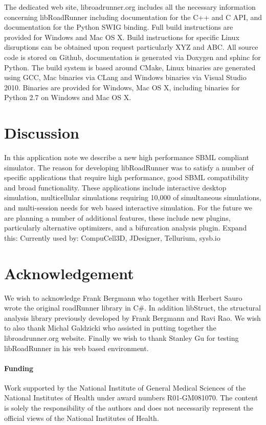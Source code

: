 \documentclass{bioinfo}
\begin{document}
\begin{methods}
The dedicated web site, libroadrunner.org includes all the necessary information concerning libRoadRunner including documentation for the C++ and C API, and documentation for the Python SWIG binding. Full build instructions are provided for Windows and Mac OS X. Build instructions for specific Linux disruptions can be obtained upon request particularly XYZ and ABC. All source code is stored on Github, documentation is generated via Doxygen and sphinc for Python. The build system is based around CMake, Linux binaries are generated using GCC, Mac binaries via CLang \citealp{Boffelli03} and Windows binaries via Visual Studio 2010. Binaries are provided for Windows, Mac OS X, including binaries for Python 2.7 on Windows and Mac OS X.

\end{methods}

\section{Discussion}

In this application note we describe a new high performance SBML compliant simulator. The reason for developing libRoadRunner was to satisfy a number of specific applications that require high performance, good SBML compatibility and broad functionality. These applications include interactive desktop simulation, multicellular simulations requiring 10,000 of simultaneous simulations, and multi-session needs for web based interactive simulation.  For the future we are planning a number of additional features, these include new plugins, particularly alternative optimizers, and a bifurcation analysis plugin. Expand this: Currently used by: CompuCell3D, JDesigner, Tellurium, sysb.io

\section*{Acknowledgement}
We wish to acknowledge Frank Bergmann who together with Herbert Sauro wrote the original roadRunner library in C\#. In addition libStruct, the structural analysis library previously developed by Frank Bergmann and Ravi Rao. We wish to also thank Michal Galdzicki who assisted in putting together the libroadrunner.org website. Finally we wish to thank Stanley Gu for testing libRoadRunner in his web based environment.

\paragraph{Funding\textcolon} Work supported by the National Institute of General Medical Sciences of the National Institutes of Health under award numbers R01-GM081070. The content is solely the responsibility of the authors and does not necessarily represent the official views of the National Institutes of Health.
\end{document}
